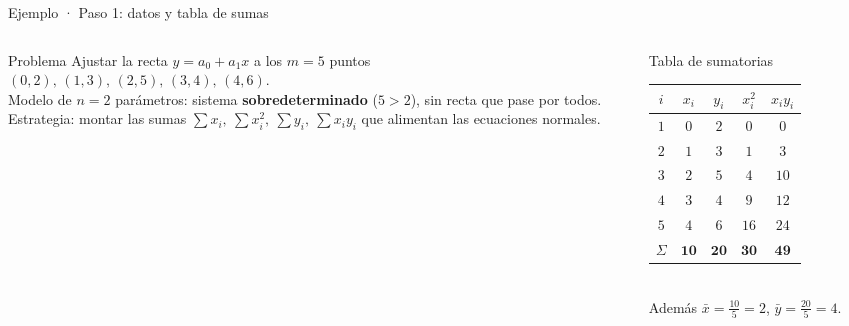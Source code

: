 \documentclass[aspectratio=169,10pt]{beamer}
\begin{document}
\begin{frame}{Ejemplo · Paso 1: datos y tabla de sumas}
\begin{columns}[T]
\begin{column}{0.42\textwidth}
\begin{cardidea}{Problema}{\faListOl}
{\footnotesize Ajustar la recta $y=a_0+a_1x$ a los $m=5$ puntos\\[0.6mm]
$(0,2),\,(1,3),\,(2,5),\,(3,4),\,(4,6)$.\\[1.2mm]
Modelo de $n=2$ parámetros: sistema \textbf{sobredeterminado} ($5>2$), sin recta que pase por todos.\\[1.0mm]
Estrategia: montar las sumas $\sum x_i,\ \sum x_i^2,\ \sum y_i,\ \sum x_iy_i$ que alimentan las ecuaciones normales.}
\end{cardidea}
\end{column}
\begin{column}{0.56\textwidth}
\begin{cardgear}{Tabla de sumatorias}{\faTable}
\centering
{\footnotesize\renewcommand{\arraystretch}{1.15}\setlength{\tabcolsep}{7pt}
\begin{tabular}{c|cccc}
$i$ & $x_i$ & $y_i$ & $x_i^2$ & $x_iy_i$\\\hline
$1$&$0$&$2$&$0$&$0$\\
$2$&$1$&$3$&$1$&$3$\\
$3$&$2$&$5$&$4$&$10$\\
$4$&$3$&$4$&$9$&$12$\\
$5$&$4$&$6$&$16$&$24$\\\hline
$\Sigma$&$\mathbf{10}$&$\mathbf{20}$&$\mathbf{30}$&$\mathbf{49}$\\
\end{tabular}}\\[1.4mm]
{\footnotesize Además $\bar x=\tfrac{10}{5}=2$, \; $\bar y=\tfrac{20}{5}=4$.}
\end{cardgear}
\end{column}
\end{columns}
\end{frame}
\end{document}
